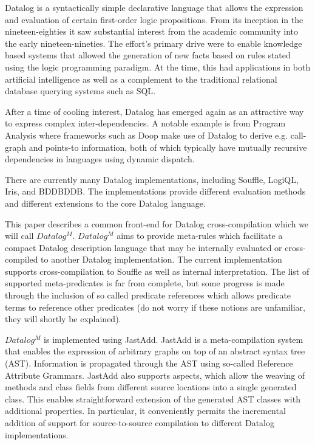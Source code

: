 Datalog is a syntactically simple declarative language that allows the expression and evaluation of certain first-order logic propositions. From its inception in the nineteen-eighties it saw substantial interest from the academic community into the early nineteen-nineties\cite{Green:2013:DRQ:2688167.2688168}. The effort's primary drive were to enable knowledge based systems that allowed the generation of new facts based on rules stated using the logic programming paradigm. At the time, this had applications in both artificial intelligence as well as a complement to the traditional relational database querying systems such as SQL\cite{Ceri:1989:YAW:627272.627357}\cite{Bancilhon:1986:AIR:16894.16859}.

After a time of cooling interest, Datalog has emerged again as an attractive way to express complex inter-dependencies\cite{Green:2013:DRQ:2688167.2688168}. A notable example is from Program Analysis where frameworks such as Doop\cite{Smaragdakis:2010:UDF:2185923.2185939} make use of Datalog to derive e.g. call-graph and points-to information, both of which typically have mutually recursive dependencies in languages using dynamic dispatch. 

There are currently many Datalog implementations, including Souffle\cite{Scholz:2016:FLP:2892208.2892226}, LogiQL\cite{Aref:2015:DIL:2723372.2742796}, Iris\cite{Bishop_iris-integrated}, and BDDBDDB\cite{Whaley:2005:UDB:2099708.2099719}. The implementations provide different evaluation methods and different extensions to the core Datalog language. 

This paper describes a common front-end for Datalog cross-compilation which we will call $Datalog^M$. $Datalog^M$ aims to provide meta-rules which facilitate a compact Datalog description language that may be internally evaluated or cross-compiled to another Datalog implementation. The current implementation supports cross-compilation to Souffle as well as internal interpretation. The list of supported meta-predicates is far from complete, but some progress is made through the inclusion of so called predicate references which allows predicate terms to reference other predicates (do not worry if these notions are unfamiliar, they will shortly be explained).

$Datalog^M$ is implemented using JastAdd\cite{Ekman:2007:JEJ:1297105.1297029}. JastAdd is a meta-compilation system that enables the expression of arbitrary graphs on top of an abstract syntax tree (AST). Information is propagated through the AST using so-called Reference Attribute Grammars\cite{Ekman:2007:JEJ:1297105.1297029}. JastAdd also supports aspects, which allow the weaving of methods and class fields from different source locations into a single generated class. This enables straightforward extension of the generated AST classes with additional properties. In particular, it conveniently permits the incremental addition of support for source-to-source compilation to different Datalog implementations. 

